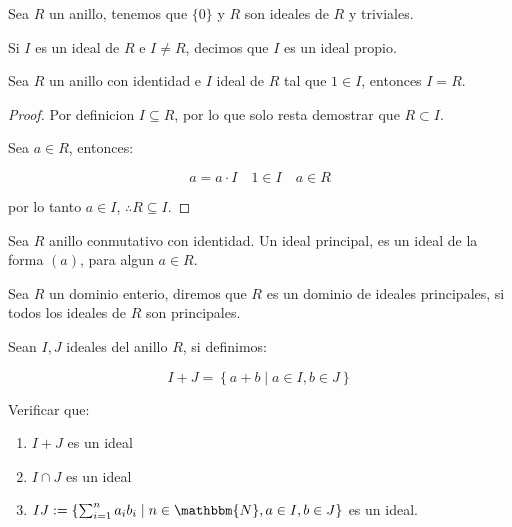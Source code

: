     \begin{observacion}
        Sea $R$ un anillo, tenemos que $\{ 0 \}$ y $R$ son ideales de $R$ y triviales.
    \end{observacion}

    \begin{definicion}
        Si $I$ es un ideal de $R$ e $I \ne R$, decimos que $I$ es un ideal propio.
    \end{definicion}

    \begin{observacion}
        Sea $R$ un anillo con identidad e $I$ ideal de $R$ tal que $1 \in I$, entonces $I = R$.
    \end{observacion}

    \begin{proof}
        Por definicion $I \subseteq R$, por lo que solo resta demostrar que $R \subset I$.

        Sea $a \in R$, entonces:

        \begin{equation*}
            a = a \cdot I \quad 1 \in I \quad a \in R
        \end{equation*}

        por lo tanto $a \in I$, $\therefore R \subseteq I$.
    \end{proof}

    \begin{definicion}
        Sea $R$ anillo conmutativo con identidad. Un ideal principal, es un ideal de la forma $(a)$, para algun $a \in R$.
    \end{definicion}

    \begin{definicion}
        Sea $R$ un dominio enterio, diremos que $R$ es un dominio de ideales principales, si todos los ideales de $R$ son principales.
    \end{definicion}

    \begin{observacion}
        Sean $I, J$ ideales del anillo $R$, si definimos:

        \begin{equation}
            I + J = \left\{ a + b \mid a \in I, b \in J \right\}
        \end{equation}

        Verificar que:

        \begin{enumerate}
            \item $I + J$ es un ideal
            \item $I \cap J$ es un ideal
            \item $IJ := \left\{ \sum_{i=1}^n a_i b_i \mid n \in \mathbbm{N}, a \in I, b \in J \right\}$ es un ideal.
        \end{enumerate}

    \end{observacion}

